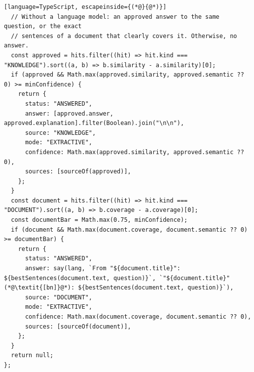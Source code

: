 \begin{lstlisting}[language=TypeScript, escapeinside={(*@}{@*)}]
  // Without a language model: an approved answer to the same question, or the exact
  // sentences of a document that clearly covers it. Otherwise, no answer.
  const approved = hits.filter((hit) => hit.kind === "KNOWLEDGE").sort((a, b) => b.similarity - a.similarity)[0];
  if (approved && Math.max(approved.similarity, approved.semantic ?? 0) >= minConfidence) {
    return {
      status: "ANSWERED",
      answer: [approved.answer, approved.explanation].filter(Boolean).join("\n\n"),
      source: "KNOWLEDGE",
      mode: "EXTRACTIVE",
      confidence: Math.max(approved.similarity, approved.semantic ?? 0),
      sources: [sourceOf(approved)],
    };
  }
  const document = hits.filter((hit) => hit.kind === "DOCUMENT").sort((a, b) => b.coverage - a.coverage)[0];
  const documentBar = Math.max(0.75, minConfidence);
  if (document && Math.max(document.coverage, document.semantic ?? 0) >= documentBar) {
    return {
      status: "ANSWERED",
      answer: say(lang, `From "${document.title}": ${bestSentences(document.text, question)}`, `"${document.title}" (*@\textit{[bn]}@*): ${bestSentences(document.text, question)}`),
      source: "DOCUMENT",
      mode: "EXTRACTIVE",
      confidence: Math.max(document.coverage, document.semantic ?? 0),
      sources: [sourceOf(document)],
    };
  }
  return null;
};
\end{lstlisting}

